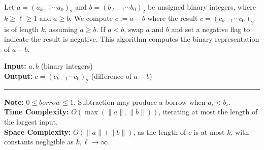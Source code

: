 \vspace{-1em}
\begin{Func}
    Let \( a = (a_{k-1} \cdots a_0)_2 \) and \( b = (b_{\ell-1} \cdots b_0)_2 \) be unsigned binary integers, where \( k \geq \ell \geq 1 \) and \( a \geq b \). We compute \( c := a - b \) where the result \( c = (c_{k-1} \cdots c_0)_2 \) is of length \( k \), assuming \( a \geq b \). If \( a < b \), swap \( a \) and \( b \) and set a negative flag to indicate the result is negative. This algorithm computes the binary representation of \( a - b \).
    
    \vspace{.5em}
    \noindent
    \textbf{Input:} \( a, b \) (binary integers)\\
    \textbf{Output:} \( c = (c_{k-1} \cdots c_0)_2 \) (difference of \( a - b \))
    
    \begin{algorithm}[H]
        \SetAlgoLined
    \end{algorithm}
\noindent\rule{\textwidth}{0.4pt}

\noindent
\textbf{Note:} $0\leq borrow\leq 1$. Subtraction may produce a borrow when $a_i < b_i$.\\
\textbf{Time Complexity:} \( O(\max(\|a\|, \|b\|)) \), iterating at most the length of the largest input.\\
\textbf{Space Complexity:} \( O(\|a\| + \|b\|) \), as the length of \( c \) is at most \( k \), with constants negligible as \( k, \ell \to \infty \).
\end{Func}
    


